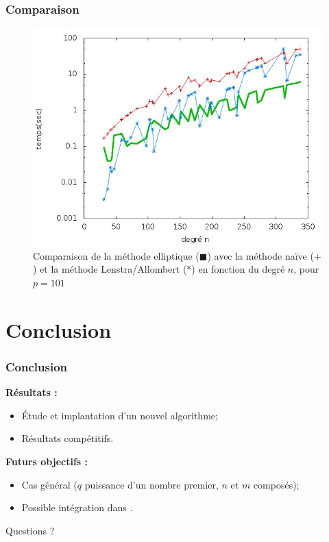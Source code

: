 \documentclass{beamer} %
\numberwithin{equation}{section}
\begin{document}
\begin{frame}
\frametitle{Comparaison}
\begin{figure}
\begin{center}
\includegraphics[scale=0.5]{data_test8_ext_flint11}
\caption*{Comparaison de la méthode elliptique (\textcolor{o1}{$\blacksquare$})
avec la méthode naïve (\textcolor{elliptique}{$+$}) et la méthode
Lenstra/Allombert (\textcolor{o2}{$*$}) en fonction du degré $n$, pour $p = 101
$}
\end{center}
\end{figure}
\end{frame}




\section{Conclusion}
\begin{frame}
\frametitle{Conclusion}
\textbf{Résultats :}
\begin{itemize}
	\item Étude et implantation d'un nouvel algorithme;
	\item Résultats compétitifs.
\end{itemize}
\vspace{0.3cm}
\textbf{Futurs objectifs :}
\begin{itemize}
	\item Cas général ($q$ puissance d'un nombre premier, $n$ et $m$ composés);
	\item Possible intégration dans .
\end{itemize}
\end{frame}
\begin{frame}[plain,c]

\begin{center}
\Huge Questions ?
\end{center}

\end{frame}
\end{document}
